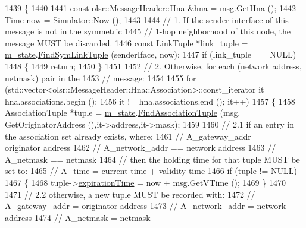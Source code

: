 \begin{DoxyCode}
1439 \{
1440 
1441   \textcolor{keyword}{const} olsr::MessageHeader::Hna &hna = msg.GetHna ();
1442   \hyperlink{namespacens3_1_1TracedValueCallback_a7ffd3e7c142ffe7c8a1d2db9b8de38ec}{Time} now = \hyperlink{classns3_1_1Simulator_ac3178fa975b419f7875e7105be122800}{Simulator::Now} ();
1443 
1444   \textcolor{comment}{// 1. If the sender interface of this message is not in the symmetric}
1445   \textcolor{comment}{// 1-hop neighborhood of this node, the message MUST be discarded.}
1446   \textcolor{keyword}{const} LinkTuple *link\_tuple = \hyperlink{classns3_1_1olsr_1_1RoutingProtocol_a07942ec1a7df71b609c8d2ff3b567c49}{m\_state}.\hyperlink{classns3_1_1olsr_1_1OlsrState_a5005529fbbd5fa4a015591a93d715890}{FindSymLinkTuple} (senderIface, now);
1447   \textcolor{keywordflow}{if} (link\_tuple == NULL)
1448     \{
1449       \textcolor{keywordflow}{return};
1450     \}
1451 
1452   \textcolor{comment}{// 2. Otherwise, for each (network address, netmask) pair in the}
1453   \textcolor{comment}{// message:}
1454 
1455   \textcolor{keywordflow}{for} (std::vector<olsr::MessageHeader::Hna::Association>::const\_iterator it = hna.associations.begin ();
1456        it != hna.associations.end (); it++)
1457     \{
1458       AssociationTuple *tuple = \hyperlink{classns3_1_1olsr_1_1RoutingProtocol_a07942ec1a7df71b609c8d2ff3b567c49}{m\_state}.\hyperlink{classns3_1_1olsr_1_1OlsrState_aa399ca44ad27907342350710d1904b84}{FindAssociationTuple} (msg.
      GetOriginatorAddress (),it->address,it->mask);
1459 
1460       \textcolor{comment}{// 2.1  if an entry in the association set already exists, where:}
1461       \textcolor{comment}{//          A\_gateway\_addr == originator address}
1462       \textcolor{comment}{//          A\_network\_addr == network address}
1463       \textcolor{comment}{//          A\_netmask      == netmask}
1464       \textcolor{comment}{//      then the holding time for that tuple MUST be set to:}
1465       \textcolor{comment}{//          A\_time         =  current time + validity time}
1466       \textcolor{keywordflow}{if} (tuple != NULL)
1467         \{
1468           tuple->\hyperlink{structns3_1_1olsr_1_1AssociationTuple_a9becaf0d713a9ed1db7834d0f3cdb864}{expirationTime} = now + msg.GetVTime ();
1469         \}
1470 
1471       \textcolor{comment}{// 2.2 otherwise, a new tuple MUST be recorded with:}
1472       \textcolor{comment}{//          A\_gateway\_addr =  originator address}
1473       \textcolor{comment}{//          A\_network\_addr =  network address}
1474       \textcolor{comment}{//          A\_netmask      =  netmask}

\end{DoxyCode}
